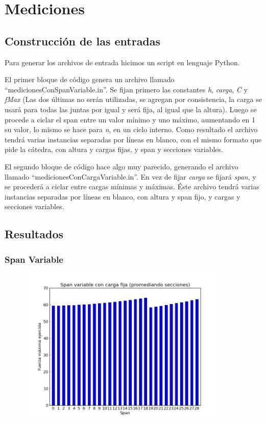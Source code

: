 \section{Mediciones}

\subsection{Construcción de las entradas}

Para generar los archivos de entrada hicimos un script en lenguaje Python.

El primer bloque de código genera un archivo llamado ``medicionesConSpanVariable.in''. Se fijan primero las constantes \emph{h}, \emph{carga}, \emph{C} y \emph{fMax}
(Las dos últimas no serán utilizadas, se agregan por consistencia, la carga se usará para todas las juntas por igual y será fija, al igual que la altura). 
Luego se procede a ciclar el span entre un valor mínimo y uno máximo, aumentando en 1 su valor, lo mismo se hace para \emph{n}, en un ciclo interno. 
Como resultado el archivo tendrá varias instancias separadas por líneas en blanco, con el mismo formato que pide la cátedra, con altura y cargas fijas, y span y secciones variables.

El segundo bloque de código hace algo muy parecido, generando el archivo llamado ``medicionesConCargaVariable.in''. En vez de fijar \emph{carga} se fijará \emph{span}, y se
procederá a ciclar entre cargas mínimas y máximas.
Éste archivo tendrá varias instancias separadas por líneas en blanco, con altura y span fijo, y cargas y secciones variables.


\subsection{Resultados}

\subsubsection{Span Variable}

\begin{figure}[H]
  \centering
    \includegraphics[width=0.9\textwidth]{../mediciones/spanVariable.png}
    \caption{}
\end{figure}

